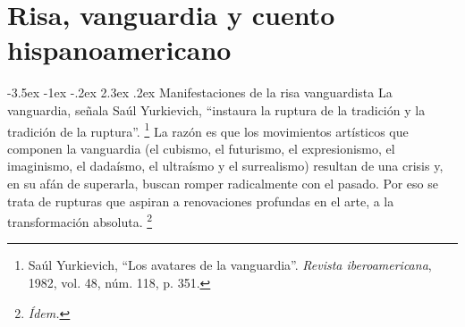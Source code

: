 \documentclass[14pt,twoside,final]{extbook} %
\makeatletter
\let\oldfootnote\footnote
\renewcommand\footnote[1]{%
\oldfootnote{\hspace{1mm}#1}}
\renewcommand\section{\@startsection {section}{1}{\z@}%
                                     {-3.5ex \@plus -1ex \@minus -.2ex}%
                                     {2.3ex \@plus .2ex}%
                                     {\normalfont\large\bfseries\sc}}
\makeatother
\begin{document}
\chapter[\textsc{Risa, vanguardia y cuento hispanoamericano}]{Risa, vanguardia y cuento hispanoamericano}\label{ch:risa-vanguardia-y-cuento-hispanoamericano}
\BgThispage
\thispagestyle{empty}
\pagestyle{fancy}
\fancyhf{} %
\fancyhead[RO,LE]{\thepage}
\renewcommand{\headrulewidth}{0pt}
\setcounter{page}{27}
\section{Manifestaciones de la risa vanguardista}\label{sec:manifestaciones-de-la-risa-vanguardista}
La vanguardia, señala Saúl Yurkievich, ``instaura la ruptura de la tradición y la tradición de la ruptura''.\footnote{Saúl Yurkievich, ``Los avatares de la vanguardia''. \emph{Revista iberoamericana}, 1982, vol. 48, núm. 118, p. 351.} La razón es que los movimientos artísticos que componen la vanguardia (el cubismo, el futurismo, el expresionismo, el imaginismo, el dadaísmo, el ultraísmo y el surrealismo) resultan de una crisis y, en su afán de superarla, buscan romper radicalmente con el pasado. Por eso se trata de rupturas que aspiran a renovaciones profundas en el arte, a la transformación absoluta.\footnote{\em Ídem.}
\end{document}
